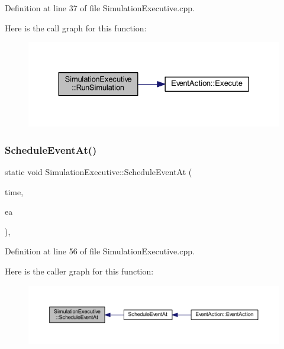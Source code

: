 Definition at line 37 of file Simulation\+Executive.\+cpp.

Here is the call graph for this function\+:
\nopagebreak
\begin{figure}[H]
\begin{center}
\leavevmode
\includegraphics[width=330pt]{class_simulation_executive_aeb51e8a0457a294919d1b02068606e14_cgraph}
\end{center}
\end{figure}
\mbox{\label{class_simulation_executive_ad060de243e8cb89fd7c7217d0c98c5c9}} 
\subsubsection{\texorpdfstring{Schedule\+Event\+At()}{ScheduleEventAt()}}
{\footnotesize\ttfamily static void Simulation\+Executive\+::\+Schedule\+Event\+At (\begin{DoxyParamCaption}\item[{\hyperlink{_simulation_executive_8h_ac2d3e0ba793497bcca555c7c2cf64ff3}{Time}}]{time,  }\item[{\hyperlink{class_event_action}{Event\+Action} $\ast$}]{ea }\end{DoxyParamCaption})\hspace{0.3cm}{\ttfamily [inline]}, {\ttfamily [static]}}



Definition at line 56 of file Simulation\+Executive.\+cpp.

Here is the caller graph for this function\+:
\nopagebreak
\begin{figure}[H]
\begin{center}
\leavevmode
\includegraphics[width=350pt]{class_simulation_executive_ad060de243e8cb89fd7c7217d0c98c5c9_icgraph}
\end{center}
\end{figure}
\mbox{\label{class_simulation_executive_ac3d1456a2f8384c22e0fce64741eaba0}} 
